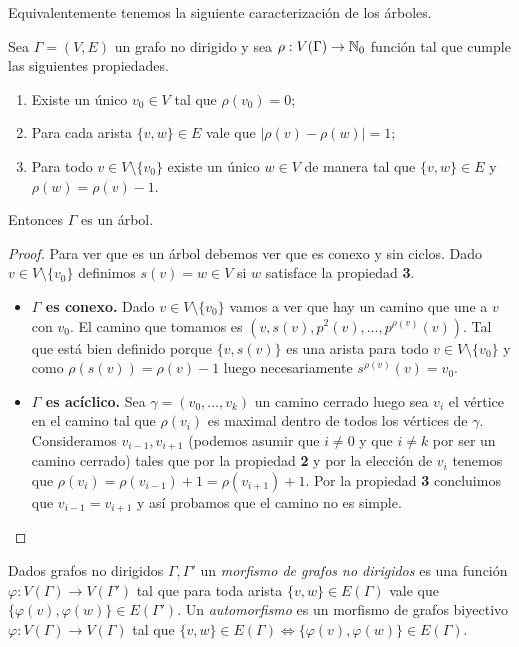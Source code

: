 \documentclass[tesis.tex]{subfiles}
\begin{document}
Equivalentemente tenemos la siguiente caracterización de los árboles.

\begin{lema}
	\label{lemma:grado_arbol}
	Sea $\Gamma = (V,E)$ un grafo no dirigido y sea $\rho:V(\Gamma) \to \mathbb{N}_{0}$ función tal que cumple las siguientes propiedades.
	\begin{enumerate}
		\item Existe un único $v_{0} \in V$ tal que $\rho(v_{0}) = 0$;
		\item Para cada arista $\{v,w\} \in E$ vale que $|\rho(v) - \rho(w)|  = 1$;
		\item Para todo $v \in V \setminus \{v_{0}\}$ existe un único $w \in V$ de manera tal que $\{v,w\} \in E$ y $\rho(w) = \rho(v) - 1$.
	\end{enumerate}
	Entonces $\Gamma$ es un árbol.
\end{lema}
\begin{proof}
	Para ver que es un árbol debemos ver que es conexo y sin ciclos.
	Dado $v \in V \setminus \{v_{0}\}$ definimos $s(v) = w \in V$ si $w$ satisface la propiedad \textbf{3}.
	\begin{itemize}
		\item \textbf{$\Gamma$ es conexo.}
			Dado $v \in V \setminus \{v_{0}\}$ vamos a ver que hay un camino que une a $v$ con $v_{0}$.
			El camino que tomamos es $(v, s(v), p^{2}(v), \dots, p^{\rho(v)}(v))$.
			Tal que está bien definido porque $\{v,s(v)\}$ es una arista para todo $v \in V \setminus \{v_{0}\}$ y como $\rho(s(v)) = \rho(v) - 1$ luego necesariamente $s^{\rho(v)}(v) = v_{0}$.


		\item \textbf{$\Gamma$ es acíclico.}
			Sea $\gamma = (v_{0}, \dots, v_{k})$ un camino cerrado luego sea $v_{i}$ el vértice en el camino tal que $\rho(v_{i})$ es maximal dentro de todos los vértices de $\gamma$.
			Consideramos $v_{i-1}, v_{i+1}$ (podemos asumir que $i \neq 0$ y que $i \neq k$ por ser un camino cerrado) tales que por la propiedad \textbf{2} y por la elección de $v_{i}$ tenemos que
			$\rho(v_{i}) = \rho(v_{i-1}) + 1 = \rho(v_{i+1}) + 1$.
			Por la propiedad \textbf{3} concluimos que $v_{i-1} = v_{i+1}$ y así probamos que el camino no es simple.

	\end{itemize}
\end{proof}


\begin{deff}
	Dados grafos no dirigidos $\Gamma, \Gamma'$ un \emph{morfismo de grafos no dirigidos} es una función $\varphi:V(\Gamma) \to V(\Gamma')$ tal que para toda arista $\{ v,w \} \in E(\Gamma)$ vale que $\{  \varphi(v), \varphi(w) \} \in E(\Gamma')$.
	Un \emph{automorfismo} es un morfismo de grafos biyectivo $\varphi: V(\Gamma) \to V(\Gamma)$ tal que 
	$\{ v,w \} \in E(\Gamma) \iff \{ \varphi(v), \varphi(w) \} \in E(\Gamma)$. 
\end{deff}
\end{document}
